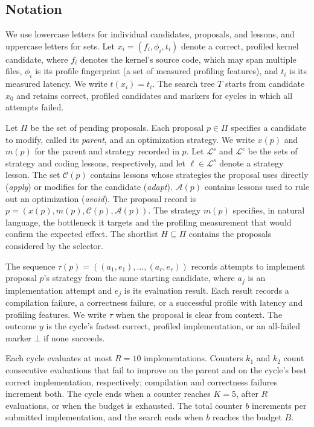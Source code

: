 \documentclass[acmsmall,screen,review,anonymous,nonacm]{acmart}
\begin{document}
\subsection{Notation}
We use lowercase letters for individual candidates, proposals, and lessons, and
uppercase letters for sets. Let $x_i=(f_i,\phi_i,t_i)$ denote a correct, profiled
kernel candidate, where $f_i$ denotes the kernel's source code,
which may span multiple files, $\phi_i$ is its profile fingerprint
(a set of measured profiling features), and $t_i$ is its measured latency.
We write $t(x_i)=t_i$. The search tree $T$ starts from candidate $x_0$ and retains
correct, profiled candidates and markers for cycles in which all attempts failed.

Let $\Pi$ be the set of pending proposals. Each proposal $p\in\Pi$ specifies
a candidate to modify, called its \emph{parent}, and an optimization strategy.
We write $x(p)$ and $m(p)$ for the parent and strategy recorded in $p$.
Let $\mathcal{L}^s$ and $\mathcal{L}^c$ be the sets of strategy and coding
lessons, respectively, and let
$\ell\in\mathcal{L}^s$ denote a strategy lesson.
The set $\mathcal{C}(p)$ contains lessons whose strategies the proposal uses
directly (\emph{apply}) or modifies for the candidate (\emph{adapt}).
$\mathcal{A}(p)$ contains lessons used to rule out an optimization (\emph{avoid}).
The proposal record is $p=(x(p),m(p),\mathcal{C}(p),\mathcal{A}(p))$.
The strategy $m(p)$ specifies, in natural language, the bottleneck it targets
and the profiling measurement that would confirm the expected effect.
The shortlist $H\subseteq\Pi$ contains the proposals considered by the selector.

The sequence $\tau(p)=((a_1,e_1),\ldots,(a_r,e_r))$ records attempts
to implement proposal $p$'s strategy from the same starting candidate,
where $a_j$ is an implementation attempt and $e_j$ is its evaluation result.
Each result records a compilation failure, a correctness failure, or a successful
profile with latency and profiling features. We write $\tau$ when the proposal
is clear from context.
The outcome $y$ is the cycle's fastest correct, profiled implementation,
or an all-failed marker $\bot$ if none succeeds.

Each cycle evaluates at most $R=10$ implementations. Counters $k_1$ and $k_2$
count consecutive evaluations that fail to improve on the parent and on the
cycle's best correct implementation, respectively; compilation and correctness
failures increment both. The cycle ends when a counter reaches $K=5$, after $R$
evaluations, or when the budget is exhausted. The total counter $b$ increments
per submitted implementation, and the search ends when $b$ reaches the budget
$B$.
\end{document}

